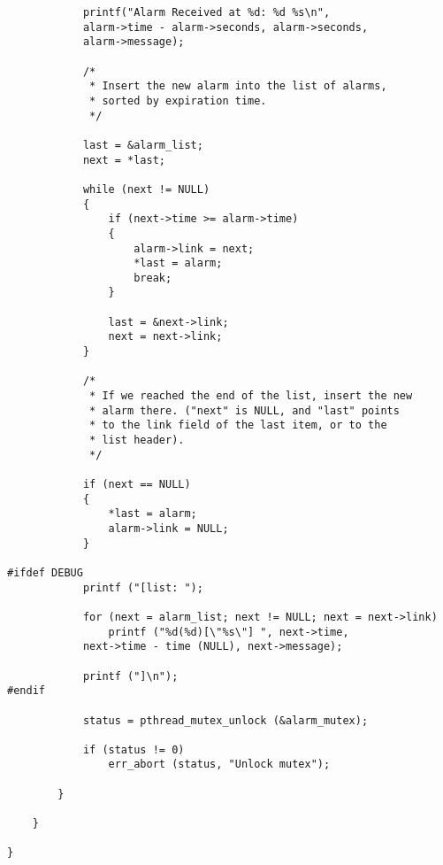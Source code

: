 \documentclass[11pt]{article}
\begin{document}
\begin{lstlisting}
            printf("Alarm Received at %d: %d %s\n", 
			alarm->time - alarm->seconds, alarm->seconds, 
			alarm->message);

            /*
             * Insert the new alarm into the list of alarms,
             * sorted by expiration time.
             */
			 
            last = &alarm_list;
            next = *last;
            
            while (next != NULL)
            {
                if (next->time >= alarm->time)
                {
                    alarm->link = next;
                    *last = alarm;
                    break;
                }
                
                last = &next->link;
                next = next->link;
            }
            
            /*
             * If we reached the end of the list, insert the new
             * alarm there. ("next" is NULL, and "last" points
             * to the link field of the last item, or to the
             * list header).
             */
			 
            if (next == NULL)
            {
                *last = alarm;
                alarm->link = NULL;
            }
            
#ifdef DEBUG
            printf ("[list: ");
            
            for (next = alarm_list; next != NULL; next = next->link)
                printf ("%d(%d)[\"%s\"] ", next->time, 
			next->time - time (NULL), next->message);
                
            printf ("]\n");
#endif
            
            status = pthread_mutex_unlock (&alarm_mutex);
            
            if (status != 0)
                err_abort (status, "Unlock mutex");
                
        }
        
    }
    
}

\end{lstlisting}
\end{document}
